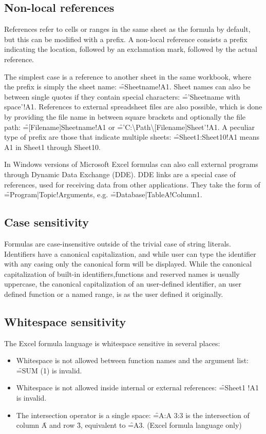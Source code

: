 \subsection{Non-local references}
\label{subsection:ExternalRefsDDE}

References refer to cells or ranges in the same sheet as the formula by default, but this can be modified with a prefix. A non-local reference consists a prefix indicating the location, followed by an exclamation mark, followed by the actual reference.

The simplest case is a reference to another sheet in the same workbook, where the prefix is simply the sheet name: \f{=Sheetname!A1}.
Sheet names can also be between single quotes if they contain special characters: \f{='Sheetname with space'!A1}. 
References to external spreadsheet files are also possible, which is done by providing the file name in between square brackets and optionally the file path: \f{=[Filename]Sheetname!A1} or \f{='C:{\textbackslash}Path{\textbackslash}[Filename]Sheet'!A1}.
A peculiar type of prefix are those that indicate multiple sheets: \f{=Sheet1:Sheet10!A1} means A1 in Sheet1 through Sheet10.

In Windows versions of Microsoft Excel formulas can also call external programs through Dynamic Data Exchange (DDE).
DDE links are a special case of references, used for receiving data from other applications.
They take the form of \f{=Program|Topic!Arguments}, e.g. \f{=Database|TableA!Column1}.

\subsection{Case sensitivity}

Formulas are case-insensitive outside of the trivial case of string literals.
Identifiers have a canonical capitalization, and while user can type the identifier with any casing only the canonical form will be displayed.
While the canonical capitalization of built-in identifiers,functions and reserved names is usually uppercase, the canonical capitalization of an user-defined identifier, an user defined function or a named range, is as the user defined it originally.

\subsection{Whitespace sensitivity}

The Excel formula language is whitespace sensitive in several places:
\begin{itemize}
\item Whitespace is not allowed between function names and the argument list: \f{=SUM  (1)} is invalid.
\item Whitespace is not allowed inside internal or external references: \f{=Sheet1 !A1} is invalid.
\item The intersection operator is a single space: \f{=A:A 3:3} is the intersection of column \f{A} and row \f{3}, equivalent to \f{=A3}. (Excel formula language only)
\end{itemize}

